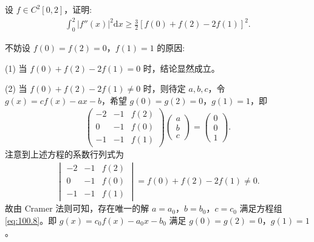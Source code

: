 \documentclass[../../main.tex]{subfiles}
\begin{document}
\begin{example}
设 \(f \in C^2[0,2]\)，证明:
\begin{align*}
\int_{0}^{2} |f''(x)|^2 \mathrm{d}x \geqslant \frac{3}{2} [f(0) + f(2) - 2f(1)]^2.
\end{align*} 
\end{example}
\begin{remark}
不妨设 \(f(0) = f(2) = 0\)，\(f(1) = 1\) 的原因:

(1) 当 \(f(0) + f(2) - 2f(1) = 0\) 时，结论显然成立。  

(2) 当 \(f(0) + f(2) - 2f(1) \ne 0\) 时，则待定 \(a, b, c\)，令 \(g(x) = c f(x) - a x - b\)，希望 \(g(0) = g(2) = 0\)，\(g(1) = 1\)，即
\begin{align}
\begin{pmatrix}
-2 & -1 & f(2) \\
0 & -1 & f(0) \\
-1 & -1 & f(1)
\end{pmatrix}
\begin{pmatrix}
a \\
b \\
c
\end{pmatrix}
=
\begin{pmatrix}
0 \\
0 \\
1
\end{pmatrix}. \label{eq:100.8}
\end{align}
注意到上述方程的系数行列式为
\begin{align*}
\begin{vmatrix}
-2 & -1 & f(2) \\
0 & -1 & f(0) \\
-1 & -1 & f(1)
\end{vmatrix}
= f(0) + f(2) - 2f(1) \ne 0.
\end{align*}
故由 Cramer 法则可知，存在唯一的解 \(a = a_0\)，\(b = b_0\)，\(c = c_0\) 满足方程组 \eqref{eq:100.8}。即 \(g(x) = c_0 f(x) - a_0 x - b_0\) 满足 \(g(0) = g(2) = 0\)，\(g(1) = 1\)。


\end{remark}
\end{document}
